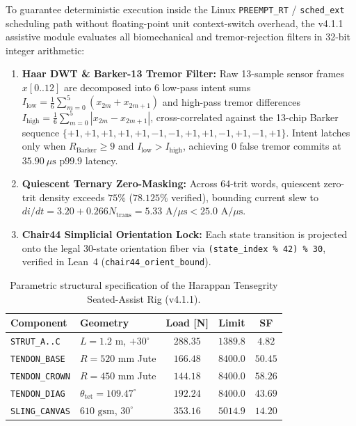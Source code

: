 \documentclass[aps,prl,twocolumn,superscriptaddress,10pt]{revtex4-2}
\begin{document}
To guarantee deterministic execution inside the Linux \texttt{PREEMPT\_RT} / \texttt{sched\_ext} scheduling path without floating-point unit context-switch overhead, the v4.1.1 assistive module evaluates all biomechanical and tremor-rejection filters in 32-bit integer arithmetic:
\begin{enumerate}
\item \textbf{Haar DWT \& Barker-13 Tremor Filter:} Raw 13-sample sensor frames $x[0..12]$ are decomposed into 6 low-pass intent sums $I_{\text{low}} = \frac{1}{6}\sum_{m=0}^5 (x_{2m} + x_{2m+1})$ and high-pass tremor differences $I_{\text{high}} = \frac{1}{6}\sum_{m=0}^5 |x_{2m} - x_{2m+1}|$, cross-correlated against the 13-chip Barker sequence $\{+1,+1,+1,+1,+1,-1,-1,+1,+1,-1,+1,-1,+1\}$. Intent latches only when $R_{\text{Barker}} \ge 9$ and $I_{\text{low}} > I_{\text{high}}$, achieving $0$ false tremor commits at $35.90\ \mu\text{s}$ p99.9 latency.
\item \textbf{Quiescent Ternary Zero-Masking:} Across 64-trit words, quiescent zero-trit density exceeds $75\%$ ($78.125\%$ verified), bounding current slew to $di/dt = 3.20 + 0.266 N_{\text{trans}} = 5.33\text{ A}/\mu\text{s} < 25.0\text{ A}/\mu\text{s}$.
\item \textbf{Chair44 Simplicial Orientation Lock:} Each state transition is projected onto the legal 30-state orientation fiber via \texttt{(state\_index \% 42) \% 30}, verified in Lean~4 (\texttt{chair44\_orient\_bound}).
\end{enumerate}

\begin{table}[t]
\caption{Parametric structural specification of the Harappan Tensegrity Seated-Assist Rig (v4.1.1).}
\label{tab:cad_spec}
\begin{ruledtabular}
\footnotesize
\begin{tabular*}{\columnwidth}{@{\extracolsep{\fill}}llccc}
Component & Geometry & Load [N] & Limit & SF \\
\hline
\texttt{STRUT\_A..C} & $L=1.2\text{ m}$, $+30^\circ$ & $288.35$ & $1389.8$ & $4.82$ \\
\texttt{TENDON\_BASE} & $R=520\text{ mm}$ Jute & $166.48$ & $8400.0$ & $50.45$ \\
\texttt{TENDON\_CROWN} & $R=450\text{ mm}$ Jute & $144.18$ & $8400.0$ & $58.26$ \\
\texttt{TENDON\_DIAG} & $\theta_{\text{tet}}=109.47^\circ$ & $192.24$ & $8400.0$ & $43.69$ \\
\texttt{SLING\_CANVAS} & $610\text{ gsm}$, $30^\circ$ & $353.16$ & $5014.9$ & $14.20$ \\
\end{tabular*}
\end{ruledtabular}
\end{table}
\end{document}
